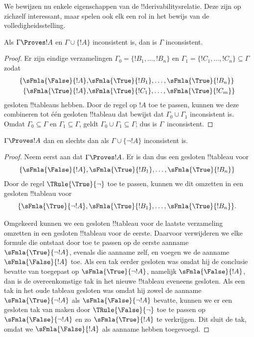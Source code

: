 \documentclass[../../../include/open-logic-section]{subfiles}
\begin{document}
      {}
      {}


We bewijzen nu enkele eigenschappen van de !!{derivability}srelatie.
Deze zijn op zichzelf interessant, maar spelen ook elk een rol in het
bewijs van de volledigheidsstelling.

\begin{prop}
  Als $\Gamma \Proves !A$ en $\Gamma \cup \{!A\}$ inconsistent is,
  dan is $\Gamma$ inconsistent.
\end{prop}

\begin{proof}
Er zijn eindige verzamelingen $\Gamma_0 = \{!B_1, \dots, !B_n\}$ en
$\Gamma_1 =\{!C_1, \dots, !C_n\} \subseteq \Gamma$ zodat
  \begin{align*}
    \{\sFmla{\False}{!A}, &
    \sFmla{\True}{!B_1}, \dots, \sFmla{\True}{!B_n}\} \\
    \{\sFmla{\True}{!A}, &
    \sFmla{\True}{!C_1}, \dots, \sFmla{\True}{!C_m}\}
  \end{align*}
  gesloten !!{tableau}s hebben. Door de regel \Cut{} op $!A$ toe te
  passen, kunnen we deze combineren tot één gesloten !!{tableau} dat
  bewijst dat $\Gamma_0 \cup \Gamma_1$ inconsistent is. Omdat
  $\Gamma_0 \subseteq \Gamma$ en $\Gamma_1 \subseteq \Gamma$, geldt
  $\Gamma_0 \cup \Gamma_1 \subseteq \Gamma$; dus is $\Gamma$~inconsistent.
\end{proof}

\begin{prop}
$\Gamma \Proves !A$ dan en slechts dan als
$\Gamma \cup \{\lnot !A\}$ inconsistent is.
\end{prop}

\begin{proof}
Neem eerst aan dat $\Gamma \Proves !A$. Er is dan dus een gesloten
!!{tableau} voor
\[
\{\sFmla{\False}{!A},
\sFmla{\True}{!B_1}, \dots, \sFmla{\True}{!B_n}\}
\]
Door de regel $\TRule{\True}{\lnot}$ toe te passen, kunnen we dit
omzetten in een gesloten !!{tableau} voor
\[
\{\sFmla{\True}{\lnot !A},
\sFmla{\True}{!B_1}, \dots, \sFmla{\True}{!B_n}\}.
\]

Omgekeerd kunnen we een gesloten !!{tableau} voor de laatste
verzameling omzetten in een gesloten !!{tableau} voor de eerste.
Daarvoor verwijderen we elke formule die ontstaat door
\TRule{\True}{\lnot} toe te passen op de eerste aanname
$\sFmla{\True}{\lnot !A}$, evenals die aanname zelf, en voegen we de
aanname $\sFmla{\False}{!A}$ toe. Als een tak eerder gesloten was
omdat hij de conclusie bevatte van \TRule{\True}{\lnot} toegepast op
$\sFmla{\True}{\lnot !A}$, namelijk $\sFmla{\False}{!A}$, dan is de
overeenkomstige tak in het nieuwe !!{tableau} eveneens gesloten. Als
een tak in het oude tableau gesloten was omdat hij zowel de aanname
$\sFmla{\True}{\lnot !A}$ als $\sFmla{\False}{\lnot !A}$ bevatte,
kunnen we er een gesloten tak van maken door
$\TRule{\False}{\lnot}$ toe te passen op
$\sFmla{\False}{\lnot !A}$ en zo $\sFmla{\True}{!A}$ te verkrijgen.
Dit sluit de tak, omdat we $\sFmla{\False}{!A}$ als aanname hebben
toegevoegd.
\end{proof}
\end{document}
